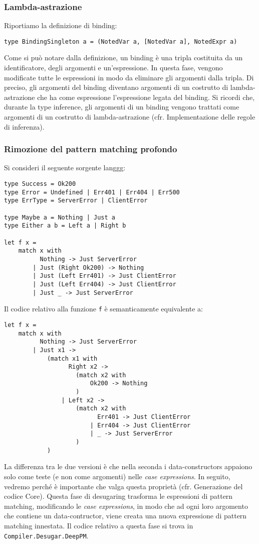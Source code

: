\documentclass[10pt,a4paper]{article}
\begin{document}
\subsubsection{Lambda-astrazione}
Riportiamo la definizione di binding:
\begin{lstlisting}
type BindingSingleton a = (NotedVar a, [NotedVar a], NotedExpr a)
\end{lstlisting}
Come si può notare dalla definizione, un binding è una tripla costituita da un identificatore, degli argomenti e
un'espressione. In questa fase, vengono modificate tutte le espressioni in modo da eliminare gli argomenti dalla
tripla. Di preciso, gli argomenti del binding diventano argomenti di un costrutto di lambda-astrazione che ha come
espressione l'espressione legata del binding. Si ricordi che, durante la type inference, gli argomenti di un binding
vengono trattati come argomenti di un costrutto di lambda-astrazione (cfr. Implementazione delle regole di inferenza).

\subsubsection{Rimozione del pattern matching profondo}
Si consideri il seguente sorgente langgg:
\begin{lstlisting}
type Success = Ok200
type Error = Undefined | Err401 | Err404 | Err500
type ErrType = ServerError | ClientError

type Maybe a = Nothing | Just a
type Either a b = Left a | Right b

let f x =
    match x with
          Nothing -> Just ServerError
        | Just (Right Ok200) -> Nothing
        | Just (Left Err401) -> Just ClientError
        | Just (Left Err404) -> Just ClientError
        | Just _ -> Just ServerError
\end{lstlisting}
Il codice relativo alla funzione \texttt{f} è semanticamente equivalente a:
\begin{lstlisting}
let f x =
    match x with
          Nothing -> Just ServerError
        | Just x1 ->
            (match x1 with
                  Right x2 ->
                    (match x2 with
                        Ok200 -> Nothing
                    )
                | Left x2 ->
                    (match x2 with
                          Err401 -> Just ClientError
                        | Err404 -> Just ClientError
                        | _ -> Just ServerError
                    )
            )
\end{lstlisting}
La differenza tra le due versioni è che nella seconda i data-constructors appaiono solo come teste (e non come argomenti)
nelle \textit{case expressions}. In seguito, vedremo perché è importante che valga questa proprietà (cfr. Generazione del
codice Core). Questa fase di desugaring trasforma le espressioni di pattern matching, modificando le
\textit{case expressions}, in modo che ad ogni loro argomento che contiene un data-contructor, viene creata una nuova
expressione di pattern matching innestata. Il codice relativo a questa fase si trova in \texttt{Compiler.Desugar.DeepPM}.
\end{document}

